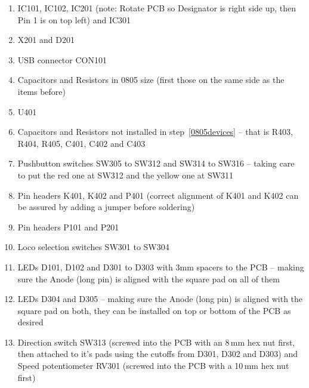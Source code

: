 \documentclass[11pt,a4paper]{scrartcl}
\begin{document}
\begin{enumerate}
\item IC101, IC102, IC201 (note: Rotate PCB so Designator is right side up, then Pin 1 is on top left) and IC301
\item X201 and D201
\item USB connector CON101
\item Capacitors and Resistors in 0805 size (first those on the same side as the items before) \label{0805devices}
\item U401
\item Capacitors and Resistors not installed in step~\ref{0805devices} -- that is R403, R404, R405, C401, C402 and C403
\item Pushbutton switches SW305 to SW312 and SW314 to SW316 -- taking care to put the red one at SW312 and the yellow one at SW311
\item Pin headers K401, K402 and P401 (correct alignment of K401 and K402 can be assured by adding a jumper before soldering)
\item Pin headers P101 and P201
\item Loco selection switches SW301 to SW304
\item LEDs D101, D102 and D301 to D303 with 3mm spacers to the PCB -- making sure the Anode (long pin) is aligned with the square pad on all of them
\item LEDs D304 and D305 -- making sure the Anode (long pin) is aligned with the square pad on both, they can be installed on top or bottom of the PCB as desired
\item Direction switch SW313 (screwed into the PCB with an 8\,mm hex nut first, then attached to it's pads using the cutoffs from D301, D302 and D303) and Speed potentiometer RV301 (screwed into the PCB with a 10\,mm hex nut first)
\end{enumerate}
\end{document}
